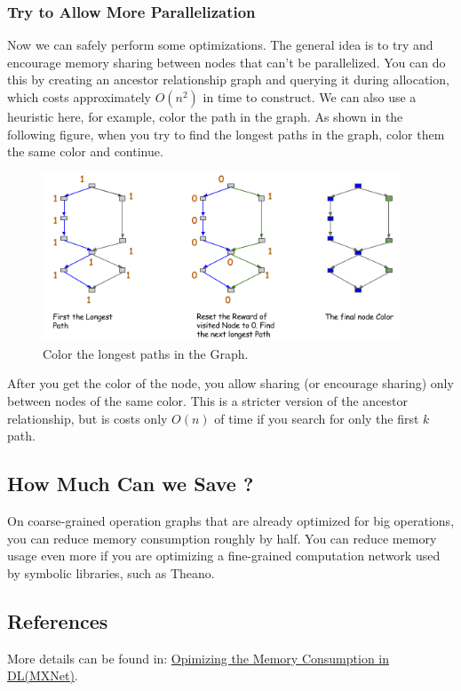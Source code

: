 \subsubsection{Try to Allow More Parallelization}
Now we can safely perform some optimizations. The general idea is to try and encourage memory sharing between nodes that can’t be parallelized. You can do this by creating an ancestor relationship graph and querying it during allocation, which costs approximately $O(n^2)$ in time to construct. We can also use a heuristic here, 
for example, color the path in the graph. As shown in the following figure, when you try to find the longest paths in the graph, color them the same color and continue.
\begin{figure}[!hbtp]
\centering
\includegraphics[width=0.95\textwidth]{MXNet/graph_color}
\caption{Color the longest paths in the Graph.}
\end{figure}

After you get the color of the node, you allow sharing (or encourage sharing) only between nodes of the same color. This is a stricter version of the ancestor relationship, but is costs only $O(n)$ of time if you search for only the first $k$ path.

\subsection{How Much Can we Save ?}
On coarse-grained operation graphs that are already optimized for big operations, you can reduce memory consumption roughly by half. You can reduce memory usage even more if you are optimizing a fine-grained computation network used by symbolic libraries, such as Theano.

\subsection{References}
More details can be found in: \href{https://mxnet.incubator.apache.org/architecture/note_memory.html#how-much-can-you-save}{Opimizing the Memory Consumption in DL(MXNet)}.


